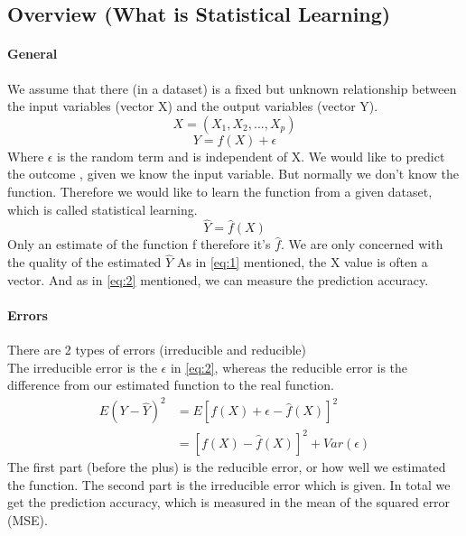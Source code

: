 \documentclass[../document.tex]{subfiles}
\begin{document}
	\subsection{Overview (What is Statistical Learning)}
	
	\paragraph{General}
	We assume that there (in a dataset) is a fixed but unknown relationship between the input variables (vector X) and the output variables (vector Y).
	\begin{equation} \label{eq:1}
	X = (X_{1},X_{2},...,X_{p})
	\end{equation}
	\begin{equation} \label{eq:2}
	Y=f(X)+\epsilon
	\end{equation}
	Where \(\epsilon\) is the random term and is independent of X.
	We would like to predict the outcome , given we know the input variable. But normally we don't know the function. Therefore we would like to learn the function from a given dataset, which is called statistical learning.\\
	\begin{equation} \label{eq:3}
	\hat{Y} = \hat{f}(X)
	\end{equation}
	Only an estimate of the function f therefore it's \(\hat{f}\). We are only concerned with the quality of the estimated \(\hat{Y}\)
	As in \ref{eq:1} mentioned, the X value is often a vector. And as in \ref{eq:2} mentioned, we can measure the prediction accuracy.\\
	
	\paragraph{Errors}
	There are 2 types of errors (irreducible and reducible)\\
	The irreducible error is the \(\epsilon\) in \ref{eq:2}, whereas the reducible error is the difference from our estimated function to the real function.
	\begin{equation}
	\begin{split}
	E(Y-\hat{Y})^2 &= E[f(X)+\epsilon-\hat{f}(X)]^2 \\
	&= [f(X)-\hat{f}(X)]^2+Var(\epsilon)
	\end{split}
	\end{equation}
	The first part (before the plus) is the reducible error, or how well we estimated the function. The second part is the irreducible error which is given. In total we get the prediction accuracy, which is measured in the mean of the squared error (MSE).
	
\end{document}
